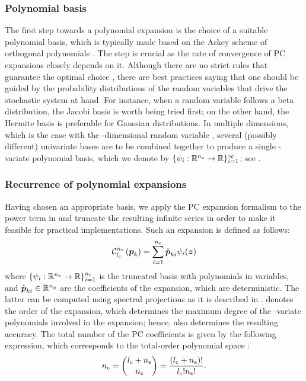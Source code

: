 \subsubsection{Polynomial basis}

The first step towards a polynomial expansion is the choice of a suitable
polynomial basis, which is typically made based on the Askey scheme of
orthogonal polynomials \cite{xiu2010}. The step is crucial as the rate of
convergence of PC expansions closely depends on it. Although there are no strict
rules that guarantee the optimal choice \cite{knio2006}, there are best
practices saying that one should be guided by the probability distributions of
the random variables that drive the stochastic system at hand. For instance,
when a random variable follows a beta distribution, the Jacobi basis is worth
being tried first; on the other hand, the Hermite basis is preferable for
Gaussian distributions. In multiple dimensions, which is the case with the
\nz-dimensional random variable \vz, several (possibly different)
univariate bases are to be combined together to produce a single
\nz-variate polynomial basis, which we denote by $\{ \psi_i: \mathbb{R}^{n_\mathrm{z}}
\to \mathbb{R} \}_{i = 1}^\infty$; see \cite{xiu2010}.

\subsubsection{Recurrence of polynomial expansions}

Having chosen an appropriate basis, we apply the PC expansion formalism to the
power term in  and truncate the resulting infinite series in
order to make it feasible for practical implementations. Such an expansion is
defined as follows:
\begin{equation} \elab{pc-expansion}
  \chaos{\nz}{\lc}{\vp_k} = \sum_{i = 1}^{\nc} \hat{\vp}_{ki} \psi_i(\vz)
\end{equation}
where $\{ \psi_i: \mathbb{R}^{n_\mathrm{z}} \to \mathbb{R} \}_{i = 1}^{{n_\mathrm{c}}}$ is the truncated
basis with \nc polynomials in \nz variables, and $\hat{\boldsymbol{p}}_{ki} \in \mathbb{R}^{n_\mathrm{p}}$
are the coefficients of the expansion, which are deterministic. The latter can
be computed using spectral projections as it is described in
. \lc denotes the order of the expansion, which determines
the maximum degree of the \nz-variate polynomials involved in the expansion;
hence, \lc also determines the resulting accuracy. The total number of the PC
coefficients \nc is given by the following expression, which corresponds to the
total-order polynomial space \cite{eldred2008, beck2011}:
\begin{equation} \elab{pc-terms}
  \nc = { \lc + \nz \choose \nz } = \frac{(\lc + \nz)!}{\lc! \nz!}.
\end{equation}

